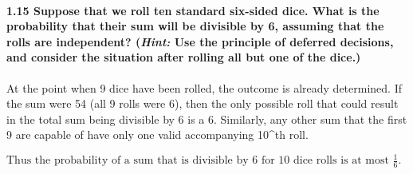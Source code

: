 \documentclass{article}
\begin{document}
\paragraph{1.15 Suppose that we roll ten standard six-sided dice. What is 
the probability that their sum will be divisible by 6, assuming that the 
rolls are independent? (\emph{Hint:} Use the principle of deferred 
decisions, and consider the situation after rolling all but one of the 
dice.)\\}
At the point when 9 dice have been rolled, the outcome is already 
determined. If the sum were 54 (all 9 rolls were 6), then the only possible 
roll that could result in the total sum being divisible by 6 is a 6. 
Similarly, any other sum that the first 9 are capable of have only one 
valid accompanying 10^{th} roll.
\begin{center}
$\boxed{\mbox{Thus the probability of a sum that is divisible by 6 for 10
dice rolls is at most } \frac{1}{6}.}$
\end{center}
\end{document}
